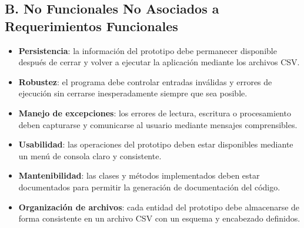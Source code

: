 \documentclass[12pt,a4paper]{article}
\begin{document}
\subsection*{B. No Funcionales No Asociados a Requerimientos Funcionales}

\begin{itemize}
    \item \textbf{Persistencia}: la información del prototipo debe permanecer disponible después de cerrar y volver a ejecutar la aplicación mediante los archivos CSV.
    \item \textbf{Robustez}: el programa debe controlar entradas inválidas y errores de ejecución sin cerrarse inesperadamente siempre que sea posible.
    \item \textbf{Manejo de excepciones}: los errores de lectura, escritura o procesamiento deben capturarse y comunicarse al usuario mediante mensajes comprensibles.
    \item \textbf{Usabilidad}: las operaciones del prototipo deben estar disponibles mediante un menú de consola claro y consistente.
    \item \textbf{Mantenibilidad}: las clases y métodos implementados deben estar documentados para permitir la generación de documentación del código.
    \item \textbf{Organización de archivos}: cada entidad del prototipo debe almacenarse de forma consistente en un archivo CSV con un esquema y encabezado definidos.
\end{itemize}
\end{document}
